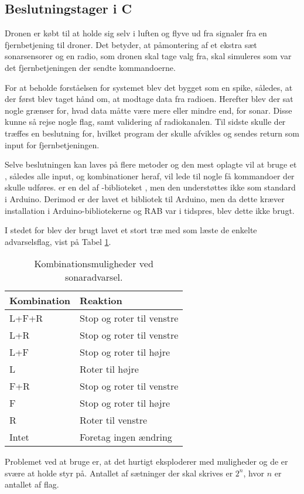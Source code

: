\documentclass[Main]{subfiles}
\begin{document}
\subsection{Beslutningstager i C}


Dronen er købt til at holde sig selv i luften og flyve ud fra signaler fra en fjernbetjening til droner.
Det betyder, at påmontering af et ekstra sæt sonarsensorer og en radio, som dronen skal tage valg fra, skal simuleres som var det fjernbetjeningen der sendte kommandoerne.

For at beholde forståelsen for systemet blev det bygget som en spike, således, at der først blev taget hånd om, at modtage data fra radioen.
Herefter blev der sat nogle grænser for, hvad data måtte være mere eller mindre end, for sonar. Disse kunne så rejse nogle flag, samt validering af radiokanalen.
Til sidste skulle der træffes en beslutning for, hvilket program der skulle afvikles og sendes return som input for fjernbetjeningen.

Selve beslutningen kan laves på flere metoder og den mest oplagte vil at bruge et , således alle input, og kombinationer heraf, vil lede til nogle få kommandoer der skulle udføres.
 er en del af -biblioteket \cite{stl}, men den understøttes ikke som standard i Arduino.
Derimod er der lavet et bibliotek til Arduino\cite{Arduino-stl}, men da dette kræver installation i Arduino-bibliotekerne og RAB var i tidspres, blev dette ikke brugt.

I stedet for  blev der brugt lavet et stort træ med  som læste de enkelte advarselsflag, vist på Tabel \ref{Tab:SonarAdvarsel}.

\begin{table}[H]
\centering
	\begin{tabular}{l l}
	\hline Kombination & Reaktion
	\\ \hline 
	L+F+R & Stop og roter til venstre \\
	L+R & Stop og roter til venstre\\
	L+F & Stop og roter til højre\\
	L & Roter til højre\\
	F+R & Stop og roter til venstre\\
	F & Stop og roter til højre\\
	R & Roter til venstre\\
	Intet & Foretag ingen ændring \\ \hline
	\end{tabular}
\caption{Kombinationsmuligheder ved sonaradvarsel.}
\label{Tab:SonarAdvarsel}
\end{table}

Problemet ved at bruge  er, at det hurtigt eksploderer med muligheder og de er svære at holde styr på.
Antallet af sætninger der skal skrives er $2^n$, hvor $n$ er antallet af flag.
\end{document}
